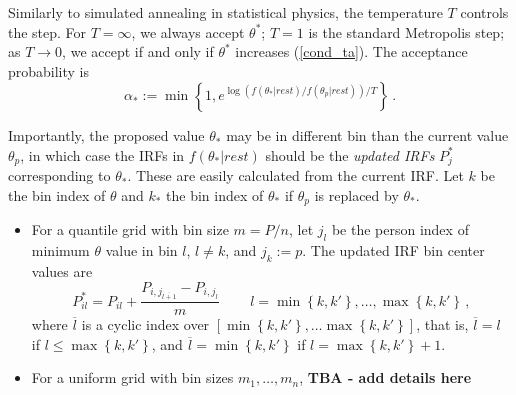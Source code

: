 \documentclass{article}
\newcommand{\ta}{\theta}
\begin{document}
Similarly to simulated annealing in statistical physics, the temperature $T$ controls the step. For $T = \infty$, we always accept $\ta^*$; $T = 1$ is the standard Metropolis step; as $T \rightarrow 0$, we accept if and only if $\ta^*$ increases (\ref{cond_ta}). The acceptance probability is
\begin{equation}
	\alpha_* := \min\left\{1, e^{\log(f(\ta_*|rest)/f(\ta_p|rest))/T} \right\}\,.
	\label{acceptable}
\end{equation}

Importantly, the proposed value $\ta_*$ may be in different bin than the current value $\ta_p$, in which case the IRFs in $f(\ta_*|rest)$ should be the {\it updated IRFs} $P^*_j$ corresponding to $\ta_*$. These are easily calculated from the current IRF. Let $k$ be the bin index of $\theta$ and $k_*$ the bin index of $\ta_*$ if $\ta_p$ is replaced by $\ta_*$. 

\begin{itemize}
	\item For a quantile grid with bin size $m = P/n$, let $j_l$ be the person index of minimum $\theta$ value in bin $l$, $l \not = k$, and
	$j_k := p$. The updated IRF bin center values are
	\begin{equation}
		P^*_{il} = P_{il} + \frac{P_{i,j_{\overline{l+1}}} - P_{i,j_l}}{m}\,\qquad
		l = \min\left\{ k,k' \right\}, \dots, \max\left\{ k, k' \right\}\,,
	\end{equation}
	where  $\overline{l}$ is a cyclic index over $[\min\left\{k,k'\right\},\dots\max\left\{k,k'\right\}]$, that is,
	$\overline{l} = l$ if $l \leq \max\left\{k,k'\right\}$, and $\overline{l} =  \min\left\{k,k'\right\}$ if $l =  \max\left\{k,k'\right\}+1$.
	
	\item For a uniform grid with bin sizes $m_1,\dots,m_n$,
	{\bf TBA - add details here}
\end{itemize}



\end{document}
